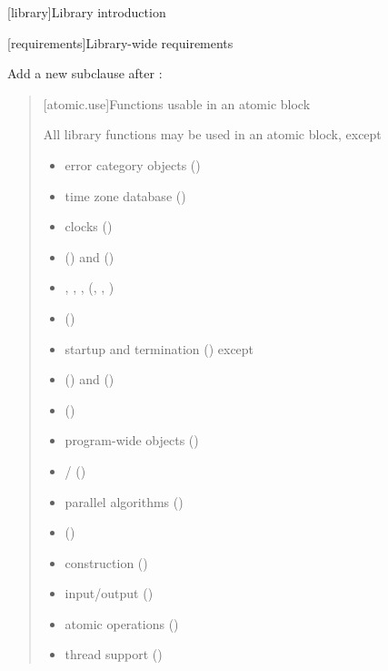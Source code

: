 [library]{Library introduction}

\setcounter{section}{3}

[requirements]{Library-wide requirements}

\setcounter{subsection}{6}
\setcounter{subsubsection}{16}

Add a new subclause after :

\begin{quote}
[atomic.use]{Functions usable in an atomic block}

\pnum
All library functions may be used in an atomic block, except

\begin{itemize}
\item
  error category objects ()
\item
  time zone database ()
\item
  clocks ()
\item
   () and 
  ()
\item
  , ,
  , 
  (, , )
\item
   ()
\item
  startup and termination () except
\item
   () and
   ()
\item
   ()
\item
  program-wide  objects
  ()
\item
   /  ()
\item
  parallel algorithms ()
\item
   ()
\item
   construction ()
\item
  input/output ()
\item
  atomic operations ()
\item
  thread support ()
\end{itemize}
\end{quote}
